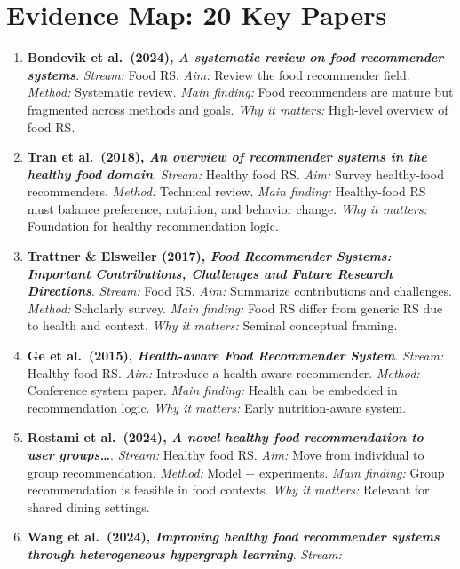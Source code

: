 \documentclass[journal]{IEEEtran}
\begin{document}
\section{Evidence Map: 20 Key Papers}\label{evidence-map-20-key-papers}

\begin{enumerate}
\def\labelenumi{\arabic{enumi}.}
\tightlist
\item
  \textbf{Bondevik et al.~(2024), \emph{A systematic review on food
  recommender systems}}. \emph{Stream:} Food RS. \emph{Aim:} Review the
  food recommender field. \emph{Method:} Systematic review. \emph{Main
  finding:} Food recommenders are mature but fragmented across methods
  and goals. \emph{Why it matters:} High-level overview of food RS.
\item
  \textbf{Tran et al.~(2018), \emph{An overview of recommender systems
  in the healthy food domain}}. \emph{Stream:} Healthy food RS.
  \emph{Aim:} Survey healthy-food recommenders. \emph{Method:} Technical
  review. \emph{Main finding:} Healthy-food RS must balance preference,
  nutrition, and behavior change. \emph{Why it matters:} Foundation for
  healthy recommendation logic.
\item
  \textbf{Trattner \& Elsweiler (2017), \emph{Food Recommender Systems:
  Important Contributions, Challenges and Future Research Directions}}.
  \emph{Stream:} Food RS. \emph{Aim:} Summarize contributions and
  challenges. \emph{Method:} Scholarly survey. \emph{Main finding:} Food
  RS differ from generic RS due to health and context. \emph{Why it
  matters:} Seminal conceptual framing.
\item
  \textbf{Ge et al.~(2015), \emph{Health-aware Food Recommender
  System}}. \emph{Stream:} Healthy food RS. \emph{Aim:} Introduce a
  health-aware recommender. \emph{Method:} Conference system paper.
  \emph{Main finding:} Health can be embedded in recommendation logic.
  \emph{Why it matters:} Early nutrition-aware system.
\item
  \textbf{Rostami et al.~(2024), \emph{A novel healthy food
  recommendation to user groups\ldots{}}}. \emph{Stream:} Healthy food
  RS. \emph{Aim:} Move from individual to group recommendation.
  \emph{Method:} Model + experiments. \emph{Main finding:} Group
  recommendation is feasible in food contexts. \emph{Why it matters:}
  Relevant for shared dining settings.
\item
  \textbf{Wang et al.~(2024), \emph{Improving healthy food recommender
  systems through heterogeneous hypergraph learning}}. \emph{Stream:}

\end{enumerate}
\end{document}

